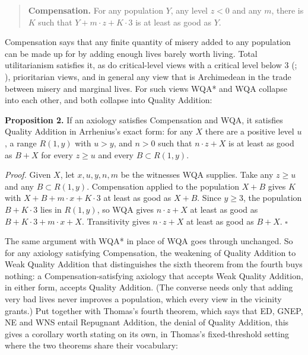 \documentclass[
  11pt,
  letterpaper,
  DIV=11,
  numbers=noendperiod,
  twoside]{scrartcl}
\begin{document}
\begin{quote}
\textbf{Compensation.} For any population \(Y\), any level \(z < 0\) and
any \(m\), there is \(K\) such that \(Y + m \cdot z + K \cdot 3\) is at
least as good as \(Y\).
\end{quote}

Compensation says that any finite quantity of misery added to any
population can be made up for by adding enough lives barely worth
living. Total utilitarianism satisfies it, as do critical-level views
with a critical level below 3
(; ), prioritarian
views, and in general any view that is Archimedean in the trade between
misery and marginal lives. For such views WQA* and WQA collapse into
each other, and both collapse into Quality Addition:

\textbf{Proposition 2.} If an axiology satisfies Compensation and WQA,
it satisfies Quality Addition in Arrhenius's exact form: for any \(X\)
there are a positive level \(u\), a range \(R(1,y)\) with \(u > y\), and
\(n > 0\) such that \(n \cdot z + X\) is at least as good as \(B + X\)
for every \(z \geq u\) and every \(B \subset R(1,y)\).

\emph{Proof.} Given \(X\), let \(x, u, y, n, m\) be the witnesses WQA
supplies. Take any \(z \geq u\) and any \(B \subset R(1,y)\).
Compensation applied to the population \(X + B\) gives \(K\) with
\(X + B + m \cdot x + K \cdot 3\) at least as good as \(X + B\). Since
\(y \geq 3\), the population \(B + K \cdot 3\) lies in \(R(1,y)\), so
WQA gives \(n \cdot z + X\) at least as good as
\(B + K \cdot 3 + m \cdot x + X\). Transitivity gives \(n \cdot z + X\)
at least as good as \(B + X\). \(\square\)

The same argument with WQA* in place of WQA goes through unchanged. So
for any axiology satisfying Compensation, the weakening of Quality
Addition to Weak Quality Addition that distinguishes the sixth theorem
from the fourth buys nothing: a Compensation-satisfying axiology that
accepts Weak Quality Addition, in either form, accepts Quality Addition.
(The converse needs only that adding very bad lives never improves a
population, which every view in the vicinity grants.) Put together with
Thomas's fourth theorem, which says that ED, GNEP, NE and WNS entail
Repugnant Addition, the denial of Quality Addition, this gives a
corollary worth stating on its own, in Thomas's fixed-threshold setting
where the two theorems share their vocabulary:
\end{document}
